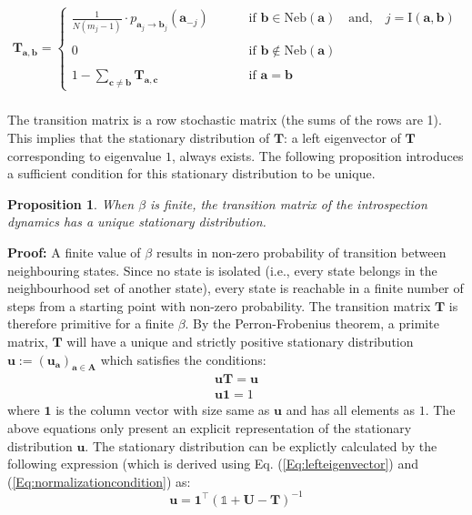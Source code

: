\documentclass[11pt]{article}
\theoremstyle{plainCl1}
\newtheorem{Prop}{Proposition}
\theoremstyle{plainCl2}
\newcommand{\A}{\mathbf{A}}
\newcommand{\abf}{\mathbf{a}}
\newcommand{\bbf}{\mathbf{b}}
\newcommand{\cbf}{\mathbf{c}}
\newcommand{\T}{\mathbf{T}}
\newcommand{\ubf}{\mathbf{u}}
\begin{document}
\begin{align}
\T_{\abf, \bbf} = 
\begin{cases}
\frac{1}{N(m_j-1)}  \cdot p_{\abf_{j} \to \bbf_{j}} (\abf_{-j}) \quad  \quad &\text{ if }\bbf \in \mathrm{Neb}(\abf) \quad \text{and,} \quad j = \mathrm{I}(\abf,\bbf)\\ \\ 
0 \quad &\text{ if } \bbf \notin \mathrm{Neb}(\abf) \\ \\
1 - \sum_{\cbf \neq \bbf} \T_{\abf,\cbf} \quad &\text{ if } \abf = \bbf
\end{cases}
\label{Eq:transition-matrix}
\end{align} \\ 
\noindent The transition matrix is a row stochastic matrix (the sums of the rows are 1). This implies that the stationary distribution of $\T$: a left eigenvector of $\T$ corresponding to eigenvalue $1$, always exists. The following proposition introduces a sufficient condition for this stationary distribution to be unique. 
\begin{Prop} When $\beta$ is finite, the transition matrix of the introspection dynamics has a unique stationary distribution. 
\label{Prop:unique-stationary-dist}
\end{Prop}
\noindent \textbf{Proof:} A finite value of $\beta$ results in non-zero probability of transition between neighbouring states. Since no state is isolated (i.e., every state belongs in the neighbourhood set of another state), every state is reachable in a finite number of steps from a starting point with non-zero probability. The transition matrix $\T$ is therefore primitive for a finite $\beta$. By the Perron-Frobenius theorem, a primite matrix, $\T$ will have a unique and strictly positive stationary distribution $\ubf := (\ubf_\abf)_{\abf \in \A}$ which satisfies the conditions: 
\begin{eqnarray}
\label{Eq:lefteigenvector}
\ubf \T = \ubf \\ 
\label{Eq:normalizationcondition}
\ubf \mathbf{1} = 1
\end{eqnarray}
\noindent where $\mathbf{1}$ is the column vector with size same as $\ubf$ and has all elements as $1$. The above equations only present an explicit representation of the stationary distribution $\ubf$. The stationary distribution can be explictly calculated by the following expression (which is derived using Eq. (\ref{Eq:lefteigenvector}) and (\ref{Eq:normalizationcondition}) as:
\begin{equation}
\ubf = \mathbf{1}^\intercal (\mathbb{1} + \mathbf{U} - \T)^{-1}
\label{Eq:explicit-stationary-dist-representation}
\end{equation}
\end{document}
